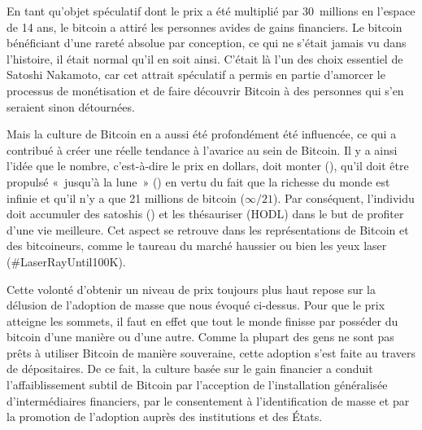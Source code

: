En tant qu'objet spéculatif dont le prix a été multiplié par 30~millions en l'espace de 14 ans, le bitcoin a attiré les personnes avides de gains financiers. Le bitcoin bénéficiant d'une rareté absolue par conception, ce qui ne s'était jamais vu dans l'histoire, il était normal qu'il en soit ainsi. C'était là l'un des choix essentiel de Satoshi Nakamoto, car cet attrait spéculatif a permis en partie d'amorcer le processus de monétisation et de faire découvrir Bitcoin à des personnes qui s'en seraient sinon détournées.

Mais la culture de Bitcoin en a aussi été profondément été influencée, ce qui a contribué à créer une réelle tendance à l'avarice au sein de Bitcoin. Il y a ainsi l'idée que le nombre, c'est-à-dire le prix en dollars, doit monter (), qu'il doit être propulsé «~jusqu'à la lune~» () en vertu du fait que la richesse du monde est infinie et qu'il n'y a que 21 millions de bitcoin ($\infty / 21$). Par conséquent, l'individu doit accumuler des satoshis () et les thésauriser (HODL) dans le but de profiter d'une vie meilleure. Cet aspect se retrouve dans les représentations de Bitcoin et des bitcoineurs, comme le taureau du marché haussier ou bien les yeux laser (\#LaserRayUntil100K). %

Cette volonté d'obtenir un niveau de prix toujours plus haut repose sur la délusion de l'adoption de masse que nous évoqué ci-dessus. Pour que le prix atteigne les sommets, il faut en effet que tout le monde finisse par posséder du bitcoin d'une manière ou d'une autre. Comme la plupart des gens ne sont pas prêts à utiliser Bitcoin de manière souveraine, cette adoption s'est faite au travers de dépositaires. De ce fait, la culture basée sur le gain financier a conduit l'affaiblissement subtil de Bitcoin par l'acception de l'installation généralisée d'intermédiaires financiers, par le consentement à l'identification de masse et par la promotion de l'adoption auprès des institutions et des États. %

